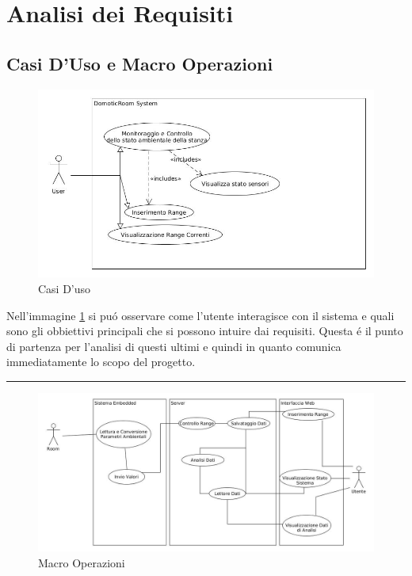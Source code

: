 \section{Analisi dei Requisiti}
\subsection{Casi D'Uso e Macro Operazioni}

\begin{figure}[ht]
\centering
\includegraphics[width=\textwidth]{Figures/UseCases}
\caption{Casi D'uso}
\label{useCases}
\end{figure}

Nell'immagine \ref{useCases} si pu\'o osservare come l'utente interagisce con il sistema e quali sono gli obbiettivi principali che si possono intuire dai requisiti. Questa \'e il punto di partenza per l'analisi di questi ultimi e quindi in quanto comunica immediatamente lo scopo del progetto.

\noindent\rule[0.5ex]{\linewidth}{1pt}

\begin{figure}[ht]
\centering
\includegraphics[width=\textwidth]{Figures/MacroOperations}
\caption{Macro Operazioni}
\label{macroOperation}
\end{figure}

